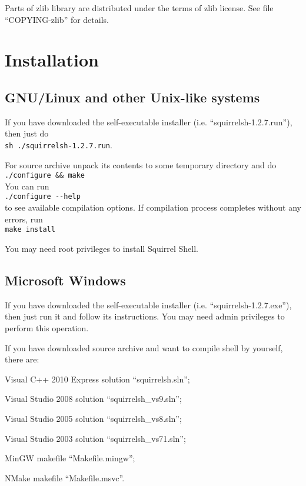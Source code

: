\documentclass[a4paper, 10pt, titlepage]{article}
\begin{document}
Parts of zlib library are distributed under the terms of zlib license. See file ``COPYING-zlib'' for details.

\section{Installation}

\subsection{GNU/Linux and other Unix-like systems}

If you have downloaded the self-executable installer (i.e. ``squirrelsh-1.2.7.run''), then just do \\
\texttt{sh ./squirrelsh-1.2.7.run}.

For source archive unpack its contents to some temporary directory and do \\
\texttt{./configure \&\& make} \\
You can run \\
\texttt{./configure {-}{-}help} \\
to see available compilation options. If compilation process completes without any errors, run \\
\texttt{make install}

You may need root privileges to install Squirrel Shell.

\subsection{Microsoft Windows}

If you have downloaded the self-executable installer (i.e. ``squirrelsh-1.2.7.exe''), then just run it and follow its instructions. You may need admin privileges to perform this operation.

If you have downloaded source archive and want to compile shell by yourself, there are:
\begin{itemize*}
\item Visual C++ 2010 Express solution ``squirrelsh.sln'';
\item Visual Studio 2008 solution ``squirrelsh\_vs9.sln'';
\item Visual Studio 2005 solution ``squirrelsh\_vs8.sln'';
\item Visual Studio 2003 solution ``squirrelsh\_vs71.sln'';
\item MinGW makefile ``Makefile.mingw'';
\item NMake makefile ``Makefile.msvc''.
\end{itemize*}
\end{document}
